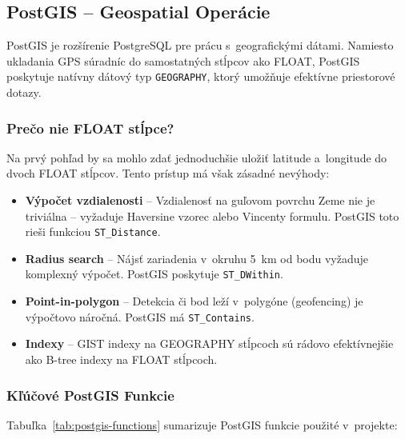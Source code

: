 \subsection{PostGIS -- Geospatial Operácie}
\label{sec:PostGIS}

PostGIS je rozšírenie PostgreSQL pre prácu s~geografickými dátami. Namiesto ukladania GPS súradníc do samostatných stĺpcov ako FLOAT, PostGIS poskytuje natívny dátový typ \texttt{GEOGRAPHY}, ktorý umožňuje efektívne priestorové dotazy.

\subsubsection{Prečo nie FLOAT stĺpce?}

Na prvý pohľad by sa mohlo zdať jednoduchšie uložiť latitude a~longitude do dvoch FLOAT stĺpcov. Tento prístup má však zásadné nevýhody:

\begin{itemize}
    \item \textbf{Výpočet vzdialenosti} -- Vzdialenosť na guľovom povrchu Zeme nie je triviálna -- vyžaduje Haversine vzorec alebo Vincenty formulu. PostGIS toto rieši funkciou \texttt{ST\_Distance}.

    \item \textbf{Radius search} -- Nájsť zariadenia v~okruhu 5~km od bodu vyžaduje komplexný výpočet. PostGIS poskytuje \texttt{ST\_DWithin}.

    \item \textbf{Point-in-polygon} -- Detekcia či bod leží v~polygóne (geofencing) je výpočtovo náročná. PostGIS má \texttt{ST\_Contains}.

    \item \textbf{Indexy} -- GIST indexy na GEOGRAPHY stĺpcoch sú rádovo efektívnejšie ako B-tree indexy na FLOAT stĺpcoch.
\end{itemize}

\subsubsection{Kľúčové PostGIS Funkcie}

Tabuľka~\ref{tab:postgis-functions} sumarizuje PostGIS funkcie použité v~projekte:

